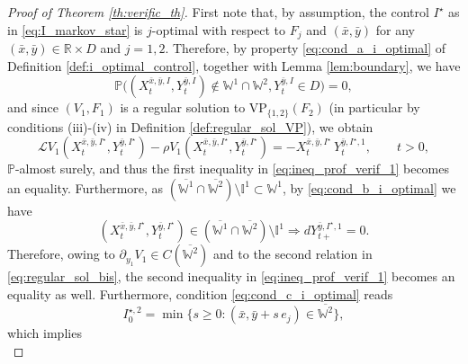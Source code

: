 \documentclass[10pt]{article}
\numberwithin{equation}{section}
\theoremstyle{plain}
\numberwithin{theorem}{section}
\theoremstyle{definition}
\def \R {\mathbb{R}}
\newcommand{\<}{\langle}
\renewcommand{\>}{\rangle}
\renewcommand{\(}{\left(}
\renewcommand{\)}{\right)}
\newcommand\Pb{\mathbb{P}}
\newcommand\Wb{\mathbb{W}}
\newcommand\Ib{\mathbb{I}}
\def \R  {{\mathbb {R}}}
\def \R {{\mathbb {R}}}
\def\cL{{\mathcal L}}
\begin{document}
{{{\begin{proof}[Proof of Theorem \ref{th:verific_th}]
First note that, by assumption, the control $I^{\star}$ as in \eqref{eq:I_markov_star} is $j$-optimal with respect to $F_j$ and $(\bar x,\bar y)$ for any $(\bar x,\bar y)\in\R \times D$ and $j=1,2$. Therefore, by property \eqref{eq:cond_a_i_optimal} of Definition \ref{def:i_optimal_control}, together with Lemma \ref{lem:boundary}, we have
\begin{equation}%
\Pb\Big( (X^{\bar x,\bar y,I}_t,Y^{\bar y,I}_t) \notin \Wb^1 \cap \Wb^2 , Y^{\bar y,I}_t \in D \Big) = 0 ,
\end{equation}
and since $(V_1,F_1)$ is a regular solution to $\text{VP}_{\{1,2\}}(F_2)$ (in particular by conditions (iii)-(iv) in Definition \ref{def:regular_sol_VP}), we obtain
\begin{equation}%
\cL V_1 (X^{\bar{x},\bar{y},I^{\star}}_t , Y^{\bar{y},I^{\star}}_t ) -\rho  V_1(X^{\bar{x},\bar{y},I^{\star}}_{t}, Y^{\bar{y},I^{\star}}_{t}) = - X^{\bar{x},\bar{y},I^{\star}}_t\,  Y^{\bar{y},I^{\star},1}_t , \qquad t>0,
\end{equation}
$\Pb$-almost surely, and thus the first inequality in \eqref{eq:ineq_prof_verif_1} becomes an equality. Furthermore, as $(\overline{\Wb^1} \cap \overline{\Wb^2})\setminus \Ib^1 \subset \Wb^1$, by \eqref{eq:cond_b_i_optimal} we have
\begin{equation}\label{eq:diff_Y_zero}
(X^{\bar x,\bar y,I^{\star}}_t, Y^{\bar y,I^{\star}}_t) \in (\overline{\Wb^1} \cap \overline{\Wb^2})\setminus \Ib^1 \Rightarrow d Y^{\bar y,I^{\star},1}_{t+} = 0.%
\end{equation}
Therefore, owing to ${\partial_{y_1} V_1} \in C(\overline{\Wb^2})$ and to the second relation in \eqref{eq:regular_sol_bis}, the second inequality in \eqref{eq:ineq_prof_verif_1} becomes an equality as well.
Furthermore, condition \eqref{eq:cond_c_i_optimal} reads 
\begin{equation}\label{eq:cond_c_i_optimal_bis}
I^{\star,2}_0 = \min\{ s\geq 0 : (\bar x,\bar y+s \, e_j)  \in \overline{\Wb^2} \},
\end{equation}
which implies
\begin{equation}%

\end{equation}
\end{proof}}}}
\end{document}
